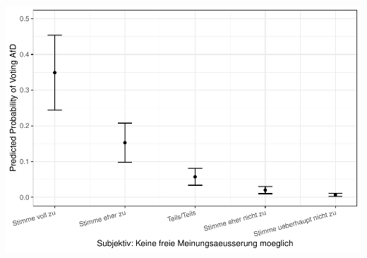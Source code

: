 \documentclass[
]{article}
\begin{document}
\includegraphics{AVCD_Final_Assignment-Edenhofer_files/figure-latex/afd-cancel-culture-1.pdf}
\end{document}
